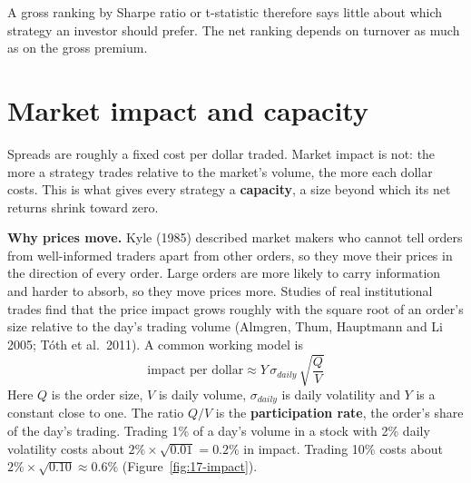
A gross ranking by Sharpe ratio or t-statistic therefore says little about which strategy an investor should prefer. The net ranking depends on turnover as much as on the gross premium.


\section{Market impact and capacity}
\label{sec:17-capacity}

Spreads are roughly a fixed cost per dollar traded. Market impact is not: the more a strategy trades relative to the market's volume, the more each dollar costs. This is what gives every strategy a \textbf{capacity}, a size beyond which its net returns shrink toward zero.

\textbf{Why prices move.} Kyle (1985) described market makers who cannot tell orders from well-informed traders apart from other orders, so they move their prices in the direction of every order. Large orders are more likely to carry information and harder to absorb, so they move prices more. Studies of real institutional trades find that the price impact grows roughly with the square root of an order's size relative to the day's trading volume (Almgren, Thum, Hauptmann and Li 2005; T\'oth et al.\ 2011). A common working model is
\begin{equation}
  \text{impact per dollar} \approx Y\,\sigma_{daily}\,\sqrt{\frac{Q}{V}}
  \label{eq:17-impact}
\end{equation}
Here $Q$ is the order size, $V$ is daily volume, $\sigma_{daily}$ is daily volatility and $Y$ is a constant close to one. The ratio $Q/V$ is the \textbf{participation rate}, the order's share of the day's trading. Trading 1\% of a day's volume in a stock with 2\% daily volatility costs about $2\% \times \sqrt{0.01} = 0.2\%$ in impact. Trading 10\% costs about $2\% \times \sqrt{0.10} \approx 0.6\%$ (Figure~\ref{fig:17-impact}).

